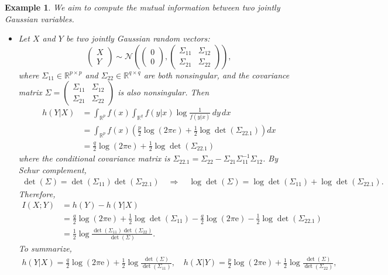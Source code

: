 \documentclass{article}
\numberwithin{equation}{section}
\newcommand{\e}{\mathrm{e}}
\newcommand{\bbR}{\mathbb{R}}
\renewcommand{\cal}{\mathcal}
\theoremstyle{plain}
\newtheorem{example}[theorem]{Example}
\theoremstyle{definition}
\begin{document}
\begin{example}
We aim to compute the mutual information between two jointly Gaussian variables.
\begin{itemize}
\item[(a)] Let $X$ and $Y$ be two jointly Gaussian random vectors:
$$\begin{pmatrix}
	X \\ Y
\end{pmatrix}\sim \cal{N}\left(\begin{pmatrix}
	0 \\ 0
\end{pmatrix},\begin{pmatrix}
	\Sigma_{11} & \Sigma_{12} \\ \Sigma_{21} & \Sigma_{22}
\end{pmatrix}\right),$$
where $\Sigma_{11}\in\bbR^{p\times p}$ and $\Sigma_{22}\in\bbR^{q\times q}$ are both nonsingular, and the covariance matrix $\Sigma=\begin{pmatrix}
	\Sigma_{11} & \Sigma_{12} \\ \Sigma_{21} & \Sigma_{22}
\end{pmatrix}$ is also nonsingular. Then
\begin{align*}
	h(Y|X)&=\int_{\bbR^p}f(x)\int_{\bbR^q}f(y|x)\log\frac{1}{f(y|x)}\,dy\,dx\\
	&=\int_{\bbR^p}f(x)\left(\frac{p}{2}\log(2\pi e)+\frac{1}{2}\log\det(\Sigma_{22.1})\right)dx\\
	&=\frac{q}{2}\log(2\pi\e)+\frac{1}{2}\log\det(\Sigma_{22.1})
\end{align*}
where the conditional covariance matrix is $\Sigma_{22.1}=\Sigma_{22}-\Sigma_{21}\Sigma_{11}^{-1}\Sigma_{12}$. By Schur complement, 
\begin{align*}
	\det(\Sigma)=\det(\Sigma_{11})\det(\Sigma_{22.1})\quad\Rightarrow\quad \log\det(\Sigma)=\log\det(\Sigma_{11})+\log\det(\Sigma_{22.1}).
\end{align*}
Therefore,
\begin{align*}
	I(X;Y)&=h(Y)-h(Y|X)\\
	&=\frac{q}{2}\log(2\pi\e)+\frac{1}{2}\log\det(\Sigma_{11})-\frac{q}{2}\log(2\pi\e)-\frac{1}{2}\log\det(\Sigma_{22.1})\\
	&=\frac{1}{2}\log\frac{\det(\Sigma_{11})\det(\Sigma_{22})}{\det(\Sigma)}.
\end{align*}
To summarize,
\begin{align*}
	h(Y|X)=\frac{q}{2}\log(2\pi\e)+\frac{1}{2}\log\frac{\det(\Sigma)}{\det(\Sigma_{11})},\quad h(X|Y)=\frac{p}{2}\log(2\pi\e)+\frac{1}{2}\log\frac{\det(\Sigma)}{\det(\Sigma_{22})},

\end{align*}
\end{itemize}
\end{example}
\end{document}
